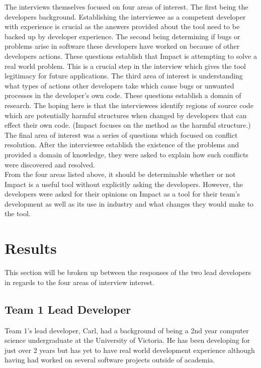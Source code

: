 \documentclass[conference]{IEEEtran}
\begin{document}
The interviews themselves focused on four areas of interest. The first being the developers background.
Establishing the interviewee as a competent developer with experience is crucial as the answers
provided about the tool need to be backed up by developer experience.  The second being determining
if bugs or problems arise in software these developers have worked on because of other developers
actions. These questions establish that Impact is attempting to solve a real world problem. This
is a crucial step in the interview which gives the tool legitimacy for future applications. The third
area of interest is understanding what types of actions other developers take which cause bugs
or unwanted processes in the developer's own code. These questions establish a domain of 
research. The hoping here is that the interviewees identify regions of source code which are
potentially harmful structures when changed by developers that can effect their own code. (Impact
focuses on the method as the harmful structure.) The final area of interest was a series of questions
which focused on conflict resolution. After the interviewee establish the existence of the problems
and provided a domain of knowledge, they were asked to explain how such conflicts were
discovered and resolved. \\

From the four areas listed above, it should be determinable whether or not Impact is a useful tool
without explicitly asking the developers. However, the developers were asked for their opinions 
on Impact as a tool for their team's development as well as its use in industry and what changes
they would make to the tool. \\


\section{Results}
This section will be broken up between the responses of the two lead developers in regards to
the four areas of interview interest.

\subsection{Team 1 Lead Developer}
Team 1's lead developer, Carl, had a background of being a 2nd year computer science undergraduate
at the University of Victoria. He has been developing for just over 2 years but has yet to have real world
development experience although having had worked on several software projects outside of academia. \\
\end{document}
